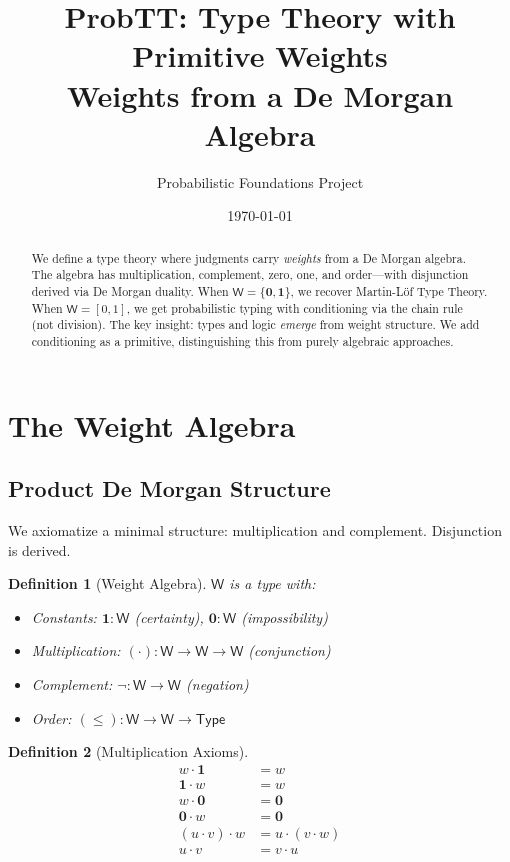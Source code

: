 \documentclass[11pt,a4paper]{article}
\title{ProbTT: Type Theory with Primitive Weights\\[0.5em]
\large Weights from a De Morgan Algebra}
\author{Probabilistic Foundations Project}
\date{\today}
\newtheorem{definition}{Definition}[section]
\newcommand{\W}{\mathsf{W}}
\newcommand{\Type}{\mathsf{Type}}
\newcommand{\one}{\mathbf{1}}
\newcommand{\zero}{\mathbf{0}}
\newcommand{\negw}{\neg}
\begin{document}
\maketitle

\begin{abstract}
We define a type theory where judgments carry \emph{weights} from a De Morgan algebra. The algebra has multiplication, complement, zero, one, and order---with disjunction derived via De Morgan duality. When $\W = \{\zero, \one\}$, we recover Martin-L\"of Type Theory. When $\W = {[0,1]}$, we get probabilistic typing with conditioning via the chain rule (not division). The key insight: types and logic \emph{emerge} from weight structure. We add conditioning as a primitive, distinguishing this from purely algebraic approaches.
\end{abstract}

\tableofcontents

\section{The Weight Algebra}

\subsection{Product De Morgan Structure}

We axiomatize a minimal structure: multiplication and complement. Disjunction is derived.

\begin{definition}[Weight Algebra]
$\W$ is a type with:
\begin{itemize}
    \item Constants: $\one : \W$ (certainty), $\zero : \W$ (impossibility)
    \item Multiplication: $(\cdot) : \W \to \W \to \W$ (conjunction)
    \item Complement: $\negw : \W \to \W$ (negation)
    \item Order: $(\leq) : \W \to \W \to \Type$
\end{itemize}
\end{definition}

\begin{definition}[Multiplication Axioms]
\begin{align}
w \cdot \one &= w \tag{unit-right} \\
\one \cdot w &= w \tag{unit-left} \\
w \cdot \zero &= \zero \tag{annihilate-right} \\
\zero \cdot w &= \zero \tag{annihilate-left} \\
(u \cdot v) \cdot w &= u \cdot (v \cdot w) \tag{assoc} \\
u \cdot v &= v \cdot u \tag{comm}
\end{align}
\end{definition}
\end{document}
